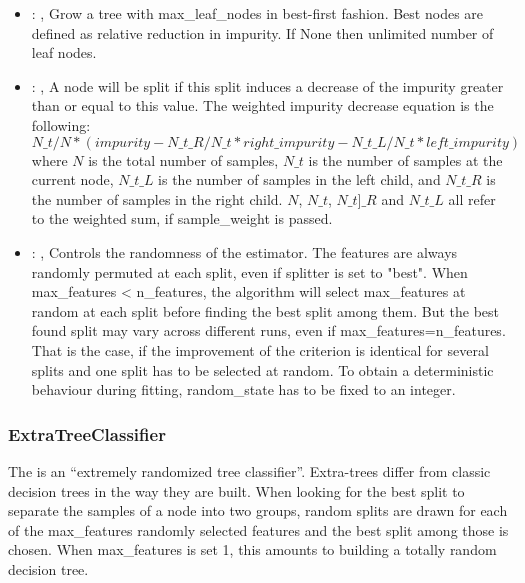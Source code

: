 \begin{itemize}
    \item {}: , 
      Grow a tree with max\_leaf\_nodes in best-first fashion. Best nodes are defined as relative
      reduction                                                  in impurity. If None then unlimited
      number of leaf nodes.

    \item {}: , 
      A node will be split if this split induces a decrease of the impurity greater than or equal to
      this value.                                                  The weighted impurity decrease
      equation is the following:                                                  $N\_t / N *
      (impurity - N\_t\_R / N\_t * right\_impurity - N\_t\_L / N\_t * left\_impurity)$
      where $N$ is the total number of samples, $N\_t$ is the number of samples at the current node,
      $N\_t\_L$ is the number                                                  of samples in the
      left child, and $N\_t\_R$ is the number of samples in the right child.
      $N$, $N\_t$, $N\_t]\_R$ and $N\_t\_L$ all refer to the weighted sum, if sample\_weight is
      passed.

    \item {}: , 
      Controls the randomness of the estimator. The features are
      always randomly permuted at each split, even if splitter is set to
      "best". When max\_features < n\_features, the algorithm will select
      max\_features at random at each split before finding the best split
      among them. But the best found split may vary across different runs,
      even if max\_features=n\_features. That is the case, if the improvement
      of the criterion is identical for several splits and one split has to
      be selected at random. To obtain a deterministic behaviour during
      fitting, random\_state has to be fixed to an integer.
  \end{itemize}


\subsubsection{ExtraTreeClassifier}
  The  is an ``extremely randomized tree classifier''.
  Extra-trees differ from classic decision trees in the way they are built. When looking for the
  best                          split to separate the samples of a node into two groups, random
  splits are drawn for each of the                          max\_features randomly selected features
  and the best split among those is chosen. When max\_features                          is set 1,
  this amounts to building a totally random decision tree.

